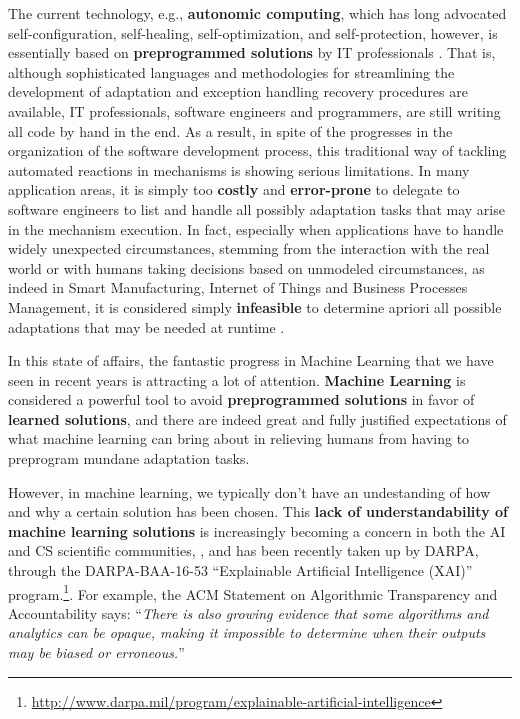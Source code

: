 The current technology, e.g., \textbf{autonomic computing}, which has
long advocated self-configuration, self-healing, self-optimization,
and self-protection, however, is essentially based on
\textbf{preprogrammed solutions} by IT professionals
\cite{ibm2005autonomic}. That is, although sophisticated languages and
methodologies for streamlining 
the development of adaptation and exception handling recovery
procedures are available, %
IT professionals, software engineers and programmers, are still
writing all code by hand in the end.
As a result, in spite of the progresses in the organization of the
software development process, this traditional way of tackling
automated reactions in mechanisms is showing serious limitations.
In many application areas, it is simply
too \textbf{costly} and
\textbf{error-prone} to delegate to software engineers to list and
handle all possibly adaptation tasks that may arise in the mechanism
execution.
In fact, especially when applications have to handle widely unexpected
circumstances, stemming from the interaction with the real world or with humans taking decisions based on unmodeled circumstances, as indeed in
Smart Manufacturing,  Internet of Things and Business Processes Management, it is
considered simply \textbf{infeasible} to determine apriori all
possible adaptations that may be needed at runtime
\cite{MarrellaMS17}.

In this state of affairs, the fantastic
progress
in Machine Learning that we 
have seen in recent years
is attracting a lot of attention. \textbf{Machine Learning} is
considered  a powerful tool to avoid \textbf{preprogrammed solutions} 
in favor of \textbf{learned solutions}, and 
there are indeed great and fully justified expectations of what machine learning can bring about in relieving 
humans from having to preprogram
mundane adaptation tasks.

However, in machine learning, we typically don't have an undestanding
of how and why a certain solution has been chosen.
This \textbf{lack of understandability of machine learning solutions}
is increasingly becoming a concern in both the AI and CS scientific
communities, \cite{RussellDT15,ACMStatement07}, and has been recently
taken up by DARPA, through the DARPA-BAA-16-53 ``Explainable
Artificial Intelligence (XAI)''
program.\footnote{\url{http://www.darpa.mil/program/explainable-artificial-intelligence}}. For
example, the ACM Statement on Algorithmic Transparency and
Accountability \cite{ACMStatement07} says: ``\emph{There is also growing
evidence that some algorithms and analytics can be opaque, making it
impossible to determine when their outputs may be biased or
erroneous.}''

